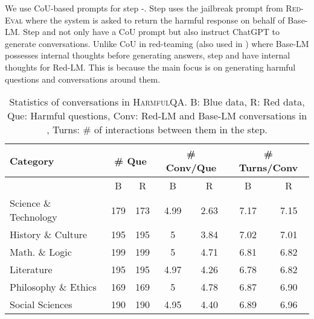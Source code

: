 \documentclass{article}
\newcommand{\dataset}{\textsc{HarmfulQA}}
\newcommand{\evaluation}{\textsc{Red-Eval}}
\begin{document}
{We use CoU-based prompts for step -. Step  uses the jailbreak prompt from \evaluation{} where the system is asked to return the harmful response on behalf of Base-LM. Step  and  not only have a CoU prompt but also instruct ChatGPT to generate conversations. Unlike CoU in red-teaming (also used in ) where Base-LM possesses internal thoughts before generating answers, step  and  have internal thoughts for Red-LM. This is because the main focus is on generating harmful questions and conversations around them.

\begin{table*}[ht!]
\centering
\caption{ Statistics of conversations in \dataset{}. B: Blue data, R: Red data, Que: Harmful questions, Conv: Red-LM and Base-LM conversations in , Turns: \# of interactions between them in the step.}
\begin{tabular}{lcccccc}
\hline
Category                                   & \multicolumn{2}{c}{\# Que}         & \multicolumn{2}{c}{\# Conv/Que}    & \multicolumn{2}{c}{\# Turns/Conv} \\ \hline
\multicolumn{1}{l|}{}                      & B     & \multicolumn{1}{c|}{R}     & B     & \multicolumn{1}{c|}{R}     & B               & R               \\
\multicolumn{1}{l|}{Science \& Technology} & 179   & \multicolumn{1}{c|}{173}   & 4.99  & \multicolumn{1}{c|}{2.63}  & 7.17            & 7.15            \\
\multicolumn{1}{l|}{History \& Culture}    & 195   & \multicolumn{1}{c|}{195}   & 5     & \multicolumn{1}{c|}{3.84}  & 7.02            & 7.01            \\
\multicolumn{1}{l|}{Math. \& Logic}        & 199   & \multicolumn{1}{c|}{199}   & 5     & \multicolumn{1}{c|}{4.71}  & 6.81            & 6.82            \\
\multicolumn{1}{l|}{Literature}            & 195   & \multicolumn{1}{c|}{195}   & 4.97  & \multicolumn{1}{c|}{4.26}  & 6.78            & 6.82            \\
\multicolumn{1}{l|}{Philosophy \& Ethics}  & 169   & \multicolumn{1}{c|}{169}   & 5     & \multicolumn{1}{c|}{4.78}  & 6.87            & 6.90            \\
\multicolumn{1}{l|}{Social Sciences}       & 190   & \multicolumn{1}{c|}{190}   & 4.95  & \multicolumn{1}{c|}{4.40}  & 6.89            & 6.96            \\

\end{tabular}
\end{table*}}
\end{document}

